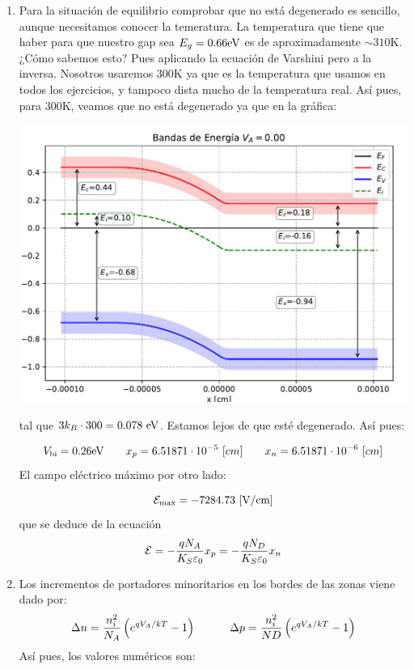 \begin{enumerate}[label=\alph*)]
    \item Para la situación de equilibrio comprobar que no está degenerado es sencillo, aunque necesitamos conocer la temeratura. La temperatura que tiene que haber para que nuestro gap sea $E_g=0.66\text{eV}$ es de aproximadamente $\sim 310$K. ¿Cómo sabemos esto? Pues aplicando la ecuación de Varshini pero a la inversa. Nosotros usaremos $300$K ya que es la temperatura que usamos en todos los ejercicios, y tampoco dista mucho de la temperatura real. Así pues, para 300K, veamos que no está degenerado ya que en la gráfica: 
    \begin{center}
        \includegraphics[width=0.6\linewidth]{Cuerpo/Ch_03/03_08_Bandas.pdf}
    \end{center}
    tal que $3k_B\cdot 300=0.078 \ \text{eV}$. Estamos lejos de que esté degenerado. Así pues: 

    \begin{equation}
        V_{\text{bi}} = 0.26 \text{eV} \qquad x_p=6.51871 \cdot 10^{-5} \ [cm] \qquad 
        x_n= 6.51871 \cdot 10^{-6} \ [cm]
    \end{equation}
    El campo eléctrico máximo por otro lado: 

    \begin{equation}
        \Ecal_{\max}=-7284.73 \ [\unit{V/cm}]
    \end{equation}
    que se deduce de la ecuación 
    \begin{equation}
        \mathcal{E} = - \frac{qN_A}{K_S\varepsilon_0} x_p = - \frac{qN_D}{K_S\varepsilon_0} x_n
    \end{equation}
    \item  Los incrementos de portadores minoritarios en los bordes de las zonas viene dado por:
    \begin{equation}
        \Delta n = \frac{n_i^2}{N_A} \left( e^{qV_A/kT}-1 \right)  \quad \quad \quad 
        \Delta p = \frac{n_i^2}{ND} \left( e^{qV_A/kT}-1 \right) 
    \end{equation}
    Así pues, los valores numéricos son:


\end{enumerate}
